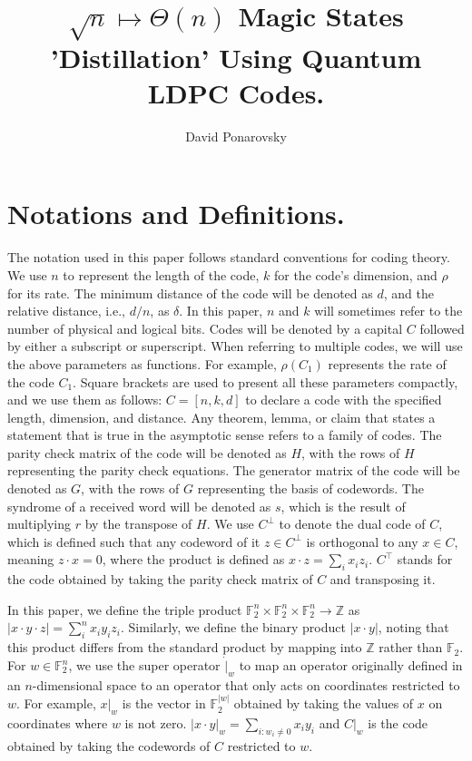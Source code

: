 \documentclass[manuscript,screen,review]{acmart}
\begin{document}

\title{ $\sqrt{n} \mapsto \Theta(n)$  Magic States 'Distillation' Using
Quantum LDPC Codes. }
\author{David Ponarovsky}
\maketitle

\newcommand*{\Mbas}{\mathcal{X}^\prime}
\newcommand*{\sMbas}{\text{span }\Mbas}
\newcommand*{\QQ}{C_{X}/C_{Z}^\perp }
\newcommand*{\trig}{Triorthogonal }
\newcommand*{\Hyp}{Hyperproduct }
\newcommand*{\Cin}{ C_{\text{initial}} }
\newcommand*{\Ctan}{ C_{\text{Tanner}} }


\section{Notations and Definitions.} The notation used in this paper follows standard conventions for coding theory. We use $n$ to represent the length of the code, $k$ for the code's dimension, and $\rho$ for its rate. The minimum distance of the code will be denoted as $d$, and the relative distance, i.e., $d/n$, as $\delta$. In this paper, $n$ and $k$ will sometimes refer to the number of physical and logical bits. Codes will be denoted by a capital $C$ followed by either a subscript or superscript. When referring to multiple codes, we will use the above parameters as functions. For example, $\rho(C_{1})$ represents the rate of the code $C_{1}$. Square brackets are used to present all these parameters compactly, and we use them as follows: $C=[n,k,d]$ to declare a code with the specified length, dimension, and distance. Any theorem, lemma, or claim that states a statement that is true in the asymptotic sense refers to a family of codes. The parity check matrix of the code will be denoted as $H$, with the rows of $H$ representing the parity check equations. The generator matrix of the code will be denoted as $G$, with the rows of $G$ representing the basis of codewords. The syndrome of a received word will be denoted as $s$, which is the result of multiplying $r$ by the transpose of $H$. We use $C^\perp$ to denote the dual code of $C$, which is defined such that any codeword of it $z\in C^\perp$ is orthogonal to any $x\in C$, meaning $z\cdot x = 0$, where the product is defined as $x\cdot z = \sum_{i}{x_{i}z_{i}}$. $C^{\top}$ stands for the code obtained by taking the parity check matrix of $C$ and transposing it.

In this paper, we define the triple product $\mathbb{F}_2^{n}\times \mathbb{F}_2^{n}\times\mathbb{F}_2^{n} \rightarrow \mathbb{Z}$ as $|x\cdot y \cdot z| = \sum_{i}^{n}{x_{i}y_{i}z_{i}}$. Similarly, we define the binary product $|x \cdot y|$, noting that this product differs from the standard product by mapping into $\mathbb{Z}$ rather than $\mathbb{F}_{2}$. For $w \in \mathbb{F}_{2}^{n}$, we use the super operator $ \dot |_{w} $ to map an operator originally defined in an $n$-dimensional space to an operator that only acts on coordinates restricted to $w$. For example, $x|_{w}$ is the vector in $\mathbb{F}_{2}^{|w|}$ obtained by taking the values of $x$ on coordinates where $w$ is not zero. $|x\cdot y|_{w} = \sum_{i:w_{i}\neq 0}{x_{i}y_{i}}$ and $C|_{w}$ is the code obtained by taking the codewords of $C$ restricted to $w$.
\end{document}
